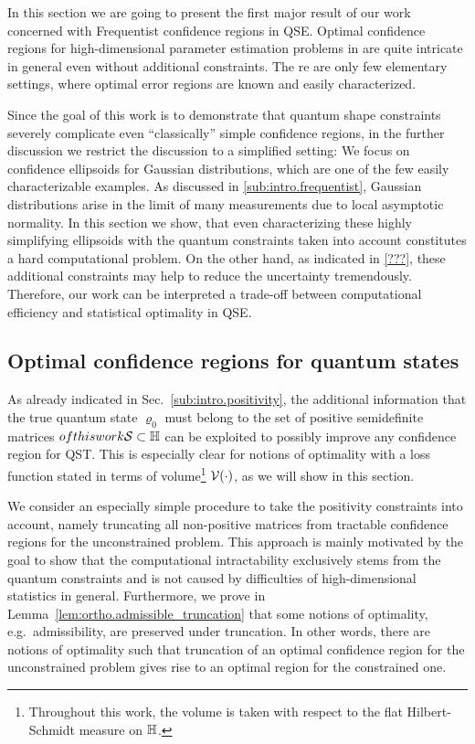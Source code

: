 In this section we are going to present the first major result of our work~\cite{Suess_2016_Error} concerned with Frequentist confidence regions in QSE.
Optimal confidence regions for high-dimensional parameter estimation problems in are quite intricate in general even without additional constraints.
The
re are only few elementary settings, where optimal error regions are known and easily characterized.

Since the goal of this work is to demonstrate that quantum shape constraints severely complicate even ``classically'' simple confidence regions, in the further discussion we restrict the discussion to a simplified setting:
We focus on confidence ellipsoids for Gaussian distributions, which are one of the few easily characterizable examples.
As discussed in \cref{sub:intro.frequentist}, Gaussian distributions arise in the limit of many measurements due to local asymptotic normality.
In this section we show, that even characterizing these highly simplifying ellipsoids with the quantum constraints taken into account constitutes a hard computational problem.
On the other hand, as indicated in \cref{???}, these additional constraints may help to reduce the uncertainty tremendously.
Therefore, our work can be interpreted a trade-off between computational efficiency and statistical optimality in QSE.

\subsection{Optimal confidence regions for quantum states}
\label{sub:ortho.optimal}

As already indicated in Sec.~\ref{sub:intro.positivity}, the additional information that the true quantum state $\varrho_0$ must belong to the set of positive semidefinite matrices $of this work \mathcal{S} \subset \mathbb{H}$ can be exploited to possibly improve any confidence region for QST.
This is especially clear for notions of optimality with a loss function stated in terms of volume\footnote{%
  Throughout this work, the volume is taken with respect to the flat Hilbert-Schmidt measure on $\mathbb{H}$.
}
$\mathcal{V}(\cdot)$, as we will show in this section.

We consider an especially simple procedure to take the positivity constraints into account, namely truncating all non-positive matrices from tractable confidence regions for the unconstrained problem.
This approach is mainly motivated by the goal to show that the computational intractability exclusively stems from the quantum constraints and is not caused by difficulties of high-dimensional statistics in general.
Furthermore, we prove in Lemma~\ref{lem:ortho.admissible_truncation} that some notions of optimality, e.g.\ admissibility, are preserved under truncation.
In other words, there are notions of optimality such that truncation of an optimal confidence region for the unconstrained problem gives rise to an optimal region for the constrained one.\\

